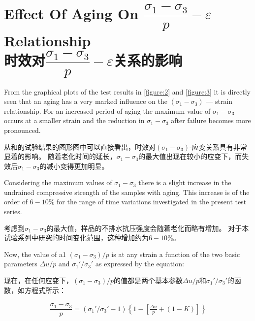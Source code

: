 \section{Effect Of Aging On $\dfrac{\sigma_1-\sigma_3}{p}-\varepsilon$ Relationship \\时效对$\dfrac{\sigma_1-\sigma_3}{p}-\varepsilon$关系的影响}

\begin{paracol}{2}
    
    From the graphical plots of the test results in \autoref{figure:2} and \autoref{figure:3} it is directly seen that an aging has a very marked influence on the $(\sigma_1-\sigma_3)$ — strain relationship. For an increased period of aging the maximum value of $\sigma_1-\sigma_3$ occurs at a smaller strain and the reduction in $\sigma_1-\sigma_3$ after failure becomes more pronounced.

    \switchcolumn

    从和的试验结果的图形图中可以直接看出，时效对$(\sigma_1-\sigma_3)$-应变关系具有非常显着的影响。 随着老化时间的延长，$\sigma_1-\sigma_3$的最大值出现在较小的应变下，而失效后$\sigma_1-\sigma_3$的减小变得更加明显。

    \switchcolumn*

    Considering the maximum values of $\sigma_1-\sigma_3$ there is a slight increase in the undrained compressive strength of the samples with aging. This increase is of the order of $6-10\%$ for the range of time variations investigated in the present test series.

    \switchcolumn
       
    考虑到$\sigma_1-\sigma_3$的最大值，样品的不排水抗压强度会随着老化而略有增加。 对于本试验系列中研究的时间变化范围，这种增加约为$6-10\%$。

    \switchcolumn*

    Now, the value of a1 $(\sigma_1-\sigma_3)/p$ is at any strain a function of the two basic parameters $\Delta{u}/p$ and $\sigma_1'/\sigma_3'$ as expressed by the equation:

    \switchcolumn
       
    现在，在任何应变下，$(\sigma_1-\sigma_3)/p$的值都是两个基本参数$\Delta{u}/p$和$\sigma_1'/\sigma_3'$的函数，如方程式所示： 

\end{paracol}

\begin{align}
    \dfrac{\sigma_1-\sigma_3}{p}=(\sigma_1'/\sigma_3'-1)\left\{1-\left[\frac{\Delta{u}}{p}+(1-K)\right]\right\}
\end{align}

